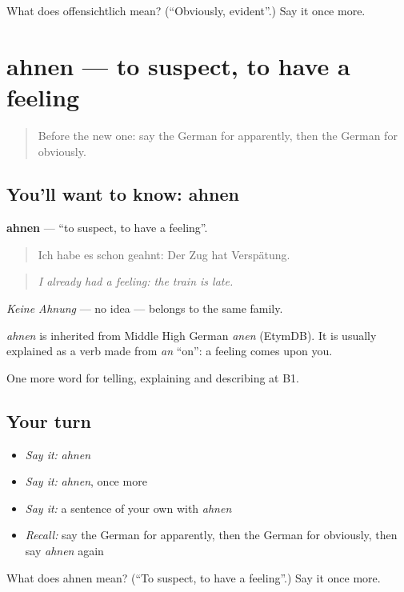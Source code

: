 \begin{tcolorbox}[breakable,colback=teal!4,colframe=teal!35!black,title={Before you move on}]
What does offensichtlich mean? (\textquotedblleft{}Obviously, evident\textquotedblright{}.) Say it once more.
\end{tcolorbox}
\section[ahnen]{ahnen — to suspect, to have a feeling}

\label{lesson:GE-C338-ahnen}



\begin{quote}
Before the new one: say the German for apparently, then the German for obviously.
\end{quote}

\subsection*{You'll want to know: ahnen}
\textbf{ahnen} — \textquotedblleft{}to suspect, to have a feeling\textquotedblright{}.

\begin{quote}
Ich habe es schon geahnt: Der Zug hat Verspätung.
\end{quote}

\begin{quote}
\emph{I already had a feeling: the train is late.}
\end{quote}

\emph{Keine Ahnung} — no idea — belongs to the same family.

\begin{cousinweb}
\emph{ahnen} is inherited from Middle High German \emph{anen} (EtymDB). It is usually explained as a verb made from \emph{an} \textquotedblleft{}on\textquotedblright{}: a feeling comes upon you.
\end{cousinweb}

\begin{grammarlens}[title={What you've built}]
One more word for telling, explaining and describing at B1.
\end{grammarlens}

\subsection*{Your turn}
\begin{itemize}
\raggedright
  \item \emph{Say it:} \emph{ahnen}
  \item \emph{Say it:} \emph{ahnen}, once more
  \item \emph{Say it:} a sentence of your own with \emph{ahnen}
  \item \emph{Recall:} say the German for apparently, then the German for obviously, then say \emph{ahnen} again
\end{itemize}

\begin{tcolorbox}[breakable,colback=teal!4,colframe=teal!35!black,title={Before you move on}]
What does ahnen mean? (\textquotedblleft{}To suspect, to have a feeling\textquotedblright{}.) Say it once more.
\end{tcolorbox}
